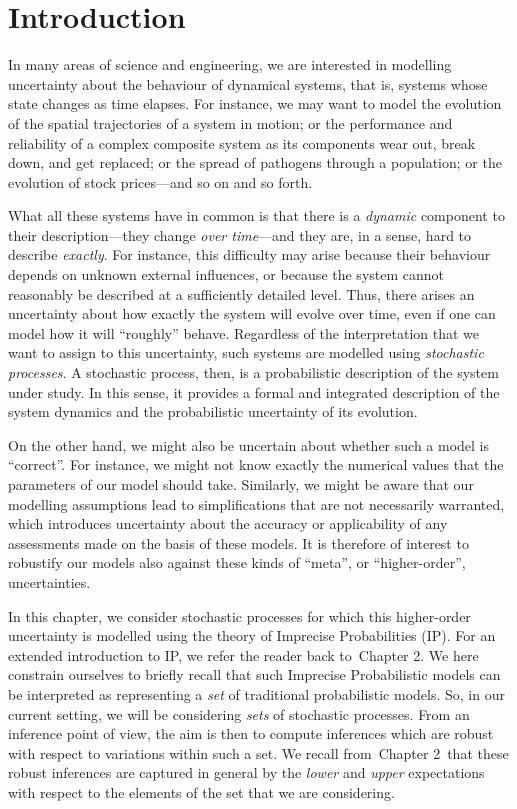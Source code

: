 \documentclass[graybox]{svmult}
\def\refIPChapter{Chapter 2}
\begin{document}
\section{Introduction}

In many areas of science and engineering, we are interested in modelling uncertainty about the behaviour of dynamical systems, that is, systems whose state changes as time elapses. For instance, we may want to model the evolution of the spatial trajectories of a system in motion; or the performance and reliability of a complex composite system as its components wear out, break down, and get replaced; or the spread of pathogens through a population; or the evolution of stock prices---and so on and so forth. 

What all these systems have in common is that there is a \emph{dynamic} component to their description---they change \emph{over time}---and they are, in a sense, hard to describe \emph{exactly}. For instance, this difficulty may arise because their behaviour depends on unknown external influences, or because the system cannot reasonably be described at a sufficiently detailed level. Thus, there arises an uncertainty about how exactly the system will evolve over time, even if one can model how it will ``roughly'' behave.
Regardless of the interpretation that we want to assign to this uncertainty, such systems are modelled using \emph{stochastic processes}. A stochastic process, then, is a probabilistic description of the system under study. In this sense, it provides a formal and integrated description of the system dynamics and the probabilistic uncertainty of its evolution.

On the other hand, we might also be uncertain about whether such a model is ``correct''. For instance, we might not know exactly the numerical values that the parameters of our model should take. Similarly, we might be aware that our modelling assumptions lead to simplifications that are not necessarily warranted, which introduces uncertainty about the accuracy or applicability of any assessments made on the basis of these models. It is therefore of interest to robustify our models also against these kinds of ``meta'', or ``higher-order'', uncertainties.

In this chapter, we consider stochastic processes for which this higher-order uncertainty is modelled using the theory of Imprecise Probabilities (IP). For an extended introduction to IP, we refer the reader back to~\refIPChapter. We here constrain ourselves to briefly recall that such Imprecise Probabilistic models can be interpreted as representing a \emph{set} of traditional probabilistic models. So, in our current setting, we will be considering \emph{sets} of stochastic processes. From an inference point of view, the aim is then to compute inferences which are robust with respect to variations within such a set. We recall from~\refIPChapter~that these robust inferences are captured in general by the \emph{lower} and \emph{upper} expectations with respect to the elements of the set that we are considering.
\end{document}
